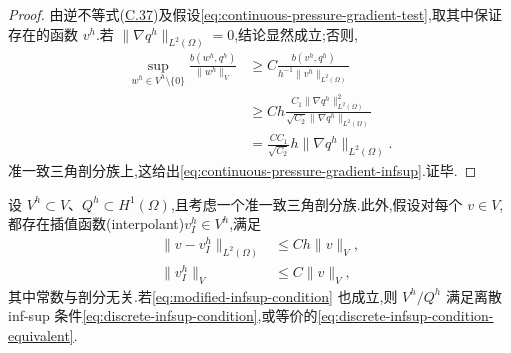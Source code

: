 \begin{proof}
由逆不等式(\hyperref[eq:appendix-c-37]{C.37})及假设\cref{eq:continuous-pressure-gradient-test},取其中保证存在的函数 $v^h$.若 $\|\nabla q^h\|_{L^2(\Omega)}=0$,结论显然成立;否则,
\[
\begin{aligned}
  \sup_{w^h\in V^h\setminus\{0\}}
    \frac{b(w^h,q^h)}{\|w^h\|_V}
  &\ge C\frac{b(v^h,q^h)}
           {h^{-1}\|v^h\|_{L^2(\Omega)}}\\
  &\ge Ch\frac{C_1\|\nabla q^h\|_{L^2(\Omega)}^2}
           {\sqrt{C_2}\|\nabla q^h\|_{L^2(\Omega)}}\\
  &=\frac{C C_1}{\sqrt{C_2}}h\|\nabla q^h\|_{L^2(\Omega)}.
\end{aligned}
\]
准一致三角剖分族上,这给出\cref{eq:continuous-pressure-gradient-infsup}.证毕.
\end{proof}

\begin{theorem}\label{thm:brezzi-bathe-continuous-pressure}
设 $V^h\subset V$、$Q^h\subset H^1(\Omega)$,且考虑一个准一致三角剖分族.此外,假设对每个 $v\in V$,都存在插值函数(interpolant)$v_I^h\in V^h$,满足
\begin{align}
  \|v-v_I^h\|_{L^2(\Omega)}
  &\le Ch\|v\|_V,\label{eq:brezzi-bathe-interpolant-l2}\\
  \|v_I^h\|_V
  &\le C\|v\|_V,\label{eq:brezzi-bathe-interpolant-v}
\end{align}
其中常数与剖分无关.若\cref{eq:modified-infsup-condition} 也成立,则 $V^h/Q^h$ 满足离散 inf-sup 条件\cref{eq:discrete-infsup-condition},或等价的\cref{eq:discrete-infsup-condition-equivalent}.
\end{theorem}

